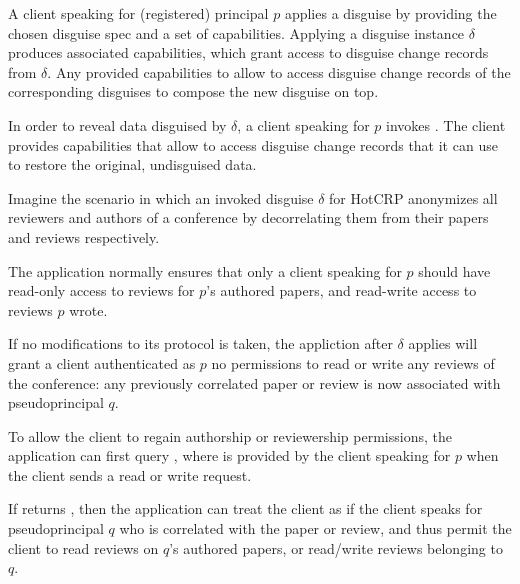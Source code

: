 
A client speaking for (registered) principal $p$ applies a disguise by providing the chosen disguise
spec and a set of capabilities. Applying a disguise instance $\delta$ produces associated
capabilities, which grant access to disguise change records from $\delta$. Any provided capabilities
to  allow \sys to access disguise change records of the corresponding disguises to
compose the new disguise on top.

In order to reveal data disguised by $\delta$, a client speaking for $p$ invokes
.
The client provides capabilities that allow \sys to access disguise change records that it can use to
restore the original, undisguised data.

Imagine the scenario in which an invoked disguise $\delta$ for HotCRP anonymizes all reviewers and authors of a
conference by decorrelating them from their papers and reviews respectively.

The application normally ensures that only a client speaking for $p$ should have read-only access to reviews
for $p$'s authored papers, and read-write access to reviews $p$ wrote.

If no modifications to its protocol is taken, the appliction after $\delta$ applies will grant a
client authenticated as $p$ no permissions to read or write any reviews of the conference: any
previously correlated paper or review is now associated with pseudoprincipal $q$.

To allow the client to regain authorship or reviewership permissions, the application can first
query , where  is provided by the
client speaking for $p$ when the client sends a read or write request.

If  returns , then the application can treat the client as if the 
client speaks for pseudoprincipal $q$ who is correlated with the paper or review, and thus permit
the client to read reviews on $q$'s authored papers, or read/write reviews belonging to $q$.





















